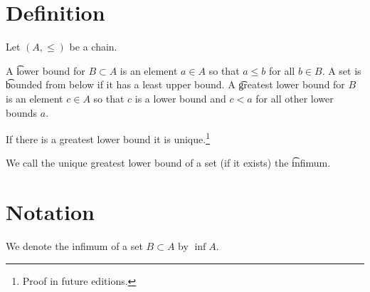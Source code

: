 

\section*{Definition}

Let $(A, \leq)$ be a chain.

A \t{lower bound} for $B \subset A$ is an element $a \in A$ so that $a \leq b$ for all $b \in B$.
A set is \t{bounded from below} if it has a least upper bound.
A \t{greatest lower bound} for $B$ is an element $c \in A$ so that $c$ is a lower bound and $c < a$ for all other lower bounds $a$.

\begin{proposition}
If there is a greatest lower bound it is unique.\footnote{Proof in future editions.}\end{proposition}
We call the unique greatest lower bound of a set (if it exists) the \t{infimum}.

\section*{Notation}

We denote the infimum of a set $B \subset A$ by $\inf A$.

\blankpage